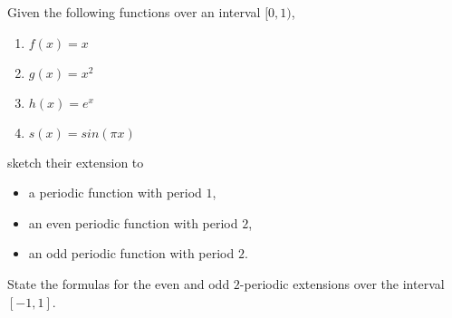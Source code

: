 \documentclass[11pt]{article}
\begin{document}








\begin{exercise}
    Given the following functions over an interval $[0,1)$, 
    \begin{enumerate}[label=(\alph*)]
        \item $f(x) = x$
        \item $g(x) = x^2$
        \item $h(x) = e^x$
        \item $s(x) = sin(\pi x)$
    \end{enumerate}
    sketch their extension to 
    \begin{itemize}
        \item a periodic function with period $1$,
        \item an even periodic function with period $2$,
        \item an odd periodic function with period $2$.
    \end{itemize}
    State the formulas for the even and odd $2$-periodic extensions over the interval $[-1,1]$.
\end{exercise}
\end{document}
